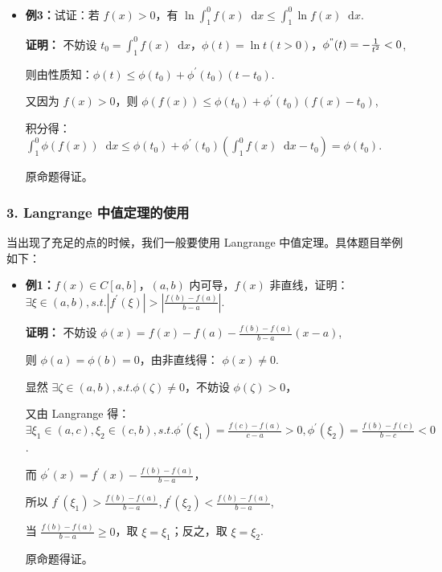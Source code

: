 \documentclass[b5paper]{ctexart}
\renewcommand{\d}{\mathop{}\!\mathrm{d}}
\begin{document}
\begin{itemize}
		\item \textbf{例3：}试证：若 $f(x) > 0$，有 $\ln \int_{1}^{0} f(x) \d x \le \int_{1}^{0} \ln f(x) \d x$.
		
		\textbf{证明：} 不妨设 $t_0 = \int_{1}^{0} f(x) \d x$，$\phi(t) = \ln t (t > 0)$，$\phi^{"}(t) = - \frac{1}{t^2} < 0$,
		
		则由性质知：$\phi(t) \le \phi(t_0) + \phi^{'}(t_0) (t - t_0)$.
		
		又因为 $f(x) > 0$，则 $\phi(f(x)) \le \phi(t_0) + \phi^{'}(t_0) (f(x) - t_0)$,
		
		积分得：$\int_{1}^{0} \phi(f(x)) \d x \le \phi(t_0) + \phi^{'}(t_0) (\int_{1}^{0} f(x)\d x - t_0) = \phi(t_0)$.
		
		原命题得证。
		
	\end{itemize}
	
	\subsubsection*{3. Langrange 中值定理的使用}
	
	当出现了充足的点的时候，我们一般要使用 Langrange 中值定理。具体题目举例如下：
	
	\begin{itemize}
		\item \textbf{例1：}$f(x) \in C[a, b]$，$(a, b)$ 内可导，$f(x)$ 非直线，证明：$\exists \xi \in (a, b), s.t. |f^{'}(\xi)| > |\frac{f(b) - f(a)}{b - a}|$.
		
		\textbf{证明：} 不妨设 $\phi(x) = f(x) - f(a) - \frac{f(b) - f(a)}{b - a}(x - a)$,
		
		则 $\phi(a) = \phi(b) = 0$，由非直线得： $\phi(x) \ne 0$.
		
		显然 $\exists \zeta \in (a, b), s.t. \phi(\zeta) \ne 0$，不妨设 $\phi(\zeta) > 0$，
		
		又由 Langrange 得： $\exists \xi_1 \in (a, c), \xi_2 \in (c, b), s.t. \phi^{'}(\xi_1) = \frac{f(c) - f(a)}{c - a} > 0, \phi^{'}(\xi_2) = \frac{f(b) - f(c)}{b - c} < 0$.
		
		而 $\phi^{'}(x) = f^{'}(x) - \frac{f(b) - f(a)}{b - a}$，
		
		所以 $f^{'}(\xi_1) >\frac{f(b) - f(a)}{b - a},  f^{'}(\xi_2) < \frac{f(b) - f(a)}{b - a}$,
		
		当 $\frac{f(b) - f(a)}{b - a} \ge 0$，取 $\xi = \xi_1$；反之，取 $\xi = \xi_2$.
		
		原命题得证。
		
		
	\end{itemize}
	
\end{document}
